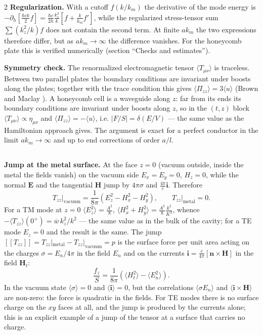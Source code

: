 \documentclass[twoside, 10pt]{article}
\def\myvspacebeforesubsection{-2.0mm}
\def\myvspaceaftersubsection{-2.5mm}
\begin{document}
\begin{multicols}{2}
\textbf{Regularization.} With a cutoff \(f(k/k_m)\) the derivative of the mode energy is
\(-\partial_h\!\left[\frac{\hbar ck}{2}f\right]=\frac{\hbar c}{2h}\frac{k_z^2}{k}\left[f+\frac{k}{k_m}f'\right]\),
while the regularized stress-tensor sum \(\sum(k_z^2/k)f\) does not contain the second term. At
finite \(ak_m\) the two expressions therefore differ, but as \(ak_m\to\infty\) the difference
vanishes. For the honeycomb plate this is verified numerically (section ``Checks and estimates'').

\textbf{Symmetry check.} The renormalized electromagnetic tensor \(\langle T_{\mu\nu}\rangle\) is
traceless. Between two parallel plates the boundary conditions are invariant under boosts along the
plates; together with the trace condition this gives \(\langle\Pi_{zz}\rangle=3\langle u\rangle\)
(Brown and Maclay \cite{BrownMaclay1969}). A honeycomb cell is a waveguide along \(z\): far from its
ends its boundary conditions are invariant under boosts along \(z\), so in the \((t,z)\) block
\(\langle T_{\mu\nu}\rangle\propto\eta_{\mu\nu}\) and \(\langle\Pi_{zz}\rangle=-\langle u\rangle\),
i.e. \(|F/S|=\delta(E/V)\) --- the same value as the Hamiltonian approach gives. The argument is
exact for a perfect conductor in the limit \(ak_m\to\infty\) and up to end corrections of order
\(a/l\).

\vspace{\myvspacebeforesubsection}
\subsection*{}
\vspace{\myvspaceaftersubsection}


\textbf{Jump at the metal surface.} At the face \(z=0\) (vacuum outside, inside the metal the fields
vanish) on the vacuum side \(E_x=E_y=0\), \(H_z=0\), while the normal \(\mathbf E\) and the
tangential \(\mathbf H\) jump by \(4\pi\sigma\) and \(\frac{4\pi}{c}\mathbf i\). Therefore
\[
T_{zz}\big|_{\text{vacuum}}=\frac1{8\pi}\left(E_z^2-H_x^2-H_y^2\right),\qquad
T_{zz}\big|_{\text{metal}}=0 .
\]
For a TM mode at \(z=0\) \(\langle E_z^2\rangle=\frac{A^2}{8}\),
\(\langle H_x^2+H_y^2\rangle=\frac{A^2}{8}\frac{k^2}{K^2}\), whence
\(-\langle T_{zz}\rangle(0^+)=\overline w\,k_z^2/k^2\) --- the same value as in the bulk of the
cavity; for a TE mode \(E_z=0\) and the result is the same. The jump
\([\![T_{zz}]\!]=T_{zz}|_{\text{metal}}-T_{zz}|_{\text{vacuum}}=p\) is the surface force per unit
area acting on the charges \(\sigma=E_n/4\pi\) in the field \(E_n\) and on the currents
\(\mathbf i=\frac{c}{4\pi}[\mathbf n\times\mathbf H]\) in the field \(\mathbf H_t\):
\[
\frac{f_z}{S}=\frac1{8\pi}\left(\langle H_t^2\rangle-\langle E_n^2\rangle\right).
\]
In the vacuum state \(\langle\sigma\rangle=0\) and \(\langle\mathbf i\rangle=0\), but the
correlations \(\langle\sigma E_n\rangle\) and \(\langle\mathbf i\times\mathbf H\rangle\) are
non-zero: the force is quadratic in the fields. For TE modes there is no surface charge on the
\(xy\) faces at all, and the jump is produced by the currents alone; this is an explicit example of a
jump of the tensor at a surface that carries no charge.


\end{multicols}
\end{document}
